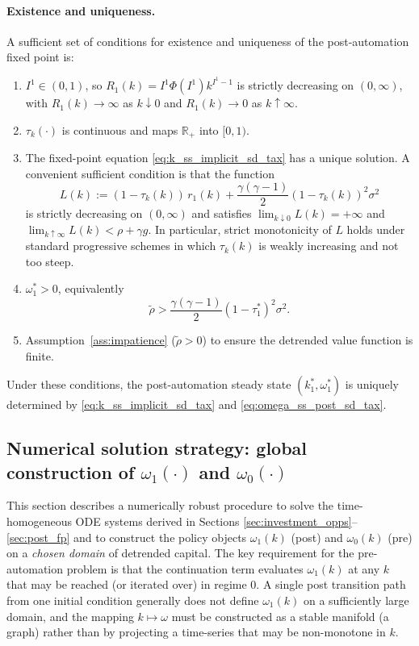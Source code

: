 \documentclass{article}
\begin{document}
\paragraph{Existence and uniqueness.}
A sufficient set of conditions for existence and uniqueness of the post-automation fixed point is:
\begin{enumerate}
\item $I^1\in(0,1)$, so $R_1(k)=I^1\Phi(I^1)k^{I^1-1}$ is strictly decreasing on $(0,\infty)$, with $R_1(k)\to\infty$ as $k\downarrow 0$ and $R_1(k)\to 0$ as $k\uparrow\infty$.
\item $\tau_k(\cdot)$ is continuous and maps $\mathbb{R}_+$ into $[0,1)$.
\item The fixed-point equation \eqref{eq:k_ss_implicit_sd_tax} has a unique solution. A convenient sufficient condition is that the function
$$
L(k):=(1-\tau_k(k))\,r_1(k)+\frac{\gamma(\gamma-1)}{2}(1-\tau_k(k))^2\sigma^2
$$
is strictly decreasing on $(0,\infty)$ and satisfies $\lim_{k\downarrow 0}L(k)=+\infty$ and $\lim_{k\uparrow\infty}L(k)<\rho+\gamma g$.
In particular, strict monotonicity of $L$ holds under standard progressive schemes in which $\tau_k(k)$ is weakly increasing and not too steep.
\item $\omega_1^\ast>0$, equivalently
$$
\tilde\rho>\frac{\gamma(\gamma-1)}{2}(1-\tau_1^\ast)^2\sigma^2.
$$
\item Assumption~\ref{ass:impatience} ($\tilde\rho>0$) to ensure the detrended value function is finite.
\end{enumerate}
Under these conditions, the post-automation steady state $(k_1^\ast,\omega_1^\ast)$ is uniquely determined by \eqref{eq:k_ss_implicit_sd_tax} and \eqref{eq:omega_ss_post_sd_tax}.

\subsection{Numerical solution strategy: global construction of $\omega_1(\cdot)$ and $\omega_0(\cdot)$}\label{sec:numerics}

This section describes a numerically robust procedure to solve the time-homogeneous
ODE systems derived in Sections \ref{sec:investment_opps}--\ref{sec:post_fp} and to
construct the policy objects $\omega_1(k)$ (post) and $\omega_0(k)$ (pre) on a
\emph{chosen domain} of detrended capital. The key requirement for the pre-automation
problem is that the continuation term evaluates $\omega_1(k)$ at any $k$ that may be
reached (or iterated over) in regime $0$. A single post transition path from one initial
condition generally does not define $\omega_1(k)$ on a sufficiently large domain, and
the mapping $k \mapsto \omega$ must be constructed as a stable manifold (a graph) rather
than by projecting a time-series that may be non-monotone in $k$.
\end{document}
